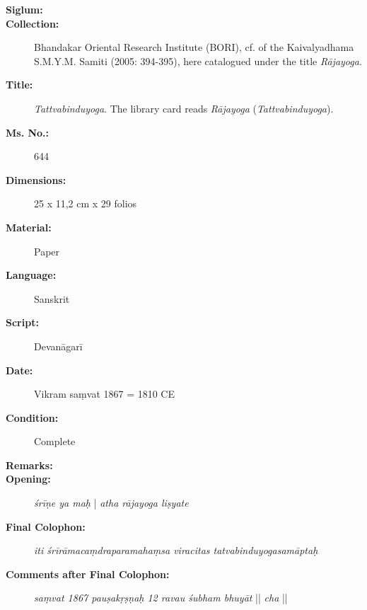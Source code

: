 \begin{description}
\item[\textbf{Siglum:}] \Huge{} \nocite{ytbp}
\item[\textbf{Collection:}] Bhandakar Oriental Research Institute (BORI), cf.  of the Kaivalyadhama S.M.Y.M. Samiti (2005: 394-395), here catalogued under the title \emph{Rājayoga}. 
\item[\textbf{Title:}] \emph{Tattvabinduyoga}. The library card reads \textit{Rājayoga} (\textit{Tattvabinduyoga}).  
\item[\textbf{Ms. No.:}] 644
\item[\textbf{Dimensions:}] 25 x 11,2 cm x 29 folios
\item[\textbf{Material:}] Paper 
\item[\textbf{Language:}] Sanskrit
\item[\textbf{Script:}] Devanāgarī
\item[\textbf{Date:}] Vikram saṃvat 1867 = 1810 CE
\item[\textbf{Condition:}] Complete
\item[\textbf{Remarks:}] 
\item[\textbf{Opening:}] \textit{śrīṇe ya maḥ} | \textit{atha rājayoga liṣyate}
\item[\textbf{Final Colophon:}] \textit{iti śrīrāmacaṃdraparamahaṃsa viracitas tatvabinduyogasamāptaḥ}
\item[\textbf{Comments after Final Colophon:}] \textit{saṃvat 1867 pauṣakṛṣṇaḥ 12 ravau śubham bhuyāt} || \textit{cha} || 
\end{description}
\newpage

